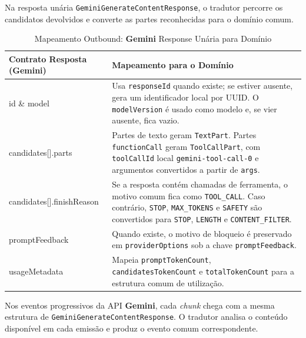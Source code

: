     Na resposta unária \texttt{GeminiGenerateContentResponse}, o tradutor percorre os candidatos devolvidos e converte as partes reconhecidas para o domínio comum.

    \begin{table}[H]
        \centering
        \footnotesize
        \renewcommand{\arraystretch}{1.25}
        \begin{tabularx}{\textwidth}{|>{\ttfamily\raggedright\arraybackslash}p{4cm}|Y|}
            \hline
            \textbf{Contrato Resposta (Gemini)} & \textbf{Mapeamento para o Domínio} \\
            \hline
            id \& model & Usa \texttt{responseId} quando existe; se estiver ausente, gera um identificador local por UUID. O \texttt{modelVersion} é usado como modelo e, se vier ausente, fica vazio. \\
            \hline
            candidates[].parts & Partes de texto geram \texttt{TextPart}. Partes \texttt{functionCall} geram \texttt{ToolCallPart}, com \texttt{toolCallId} local \texttt{gemini-tool-call-0} e argumentos convertidos a partir de \texttt{args}. \\
            \hline
            candidates[].finishReason & Se a resposta contém chamadas de ferramenta, o motivo comum fica como \texttt{TOOL\_CALL}. Caso contrário, \texttt{STOP}, \texttt{MAX\_TOKENS} e \texttt{SAFETY} são convertidos para \texttt{STOP}, \texttt{LENGTH} e \texttt{CONTENT\_FILTER}. \\
            \hline
            promptFeedback & Quando existe, o motivo de bloqueio é preservado em \texttt{providerOptions} sob a chave \texttt{promptFeedback}. \\
            \hline
            usageMetadata & Mapeia \texttt{promptTokenCount}, \texttt{candidatesTokenCount} e \texttt{totalTokenCount} para a estrutura comum de utilização. \\
            \hline
        \end{tabularx}
        \caption{Mapeamento Outbound: \textbf{Gemini} Response Unária para Domínio}
    \end{table}

    Nos eventos progressivos da API \textbf{Gemini}, cada \textit{chunk} chega com a mesma estrutura de \texttt{GeminiGenerateContentResponse}. O tradutor analisa o conteúdo disponível em cada emissão e produz o evento comum correspondente.

